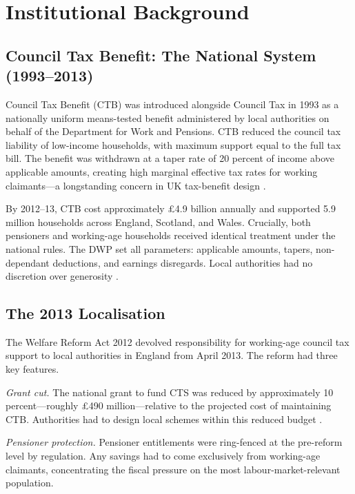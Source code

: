 \documentclass[12pt]{article}
\begin{document}
\section{Institutional Background}

\subsection{Council Tax Benefit: The National System (1993--2013)}

Council Tax Benefit (CTB) was introduced alongside Council Tax in 1993 as a nationally uniform means-tested benefit administered by local authorities on behalf of the Department for Work and Pensions. CTB reduced the council tax liability of low-income households, with maximum support equal to the full tax bill. The benefit was withdrawn at a taper rate of 20 percent of income above applicable amounts, creating high marginal effective tax rates for working claimants---a longstanding concern in UK tax-benefit design \citep{mirrlees2011tax, brewer2010labour}.

By 2012--13, CTB cost approximately \pounds 4.9 billion annually and supported 5.9 million households across England, Scotland, and Wales. Crucially, both pensioners and working-age households received identical treatment under the national rules. The DWP set all parameters: applicable amounts, tapers, non-dependant deductions, and earnings disregards. Local authorities had no discretion over generosity \citep{ifs2013localising}.

\subsection{The 2013 Localisation}

The Welfare Reform Act 2012 devolved responsibility for working-age council tax support to local authorities in England from April 2013. The reform had three key features.

\emph{Grant cut.} The national grant to fund CTS was reduced by approximately 10 percent---roughly \pounds 490 million---relative to the projected cost of maintaining CTB. Authorities had to design local schemes within this reduced budget \citep{nao2013localising}.

\emph{Pensioner protection.} Pensioner entitlements were ring-fenced at the pre-reform level by regulation. Any savings had to come exclusively from working-age claimants, concentrating the fiscal pressure on the most labour-market-relevant population.
\end{document}
